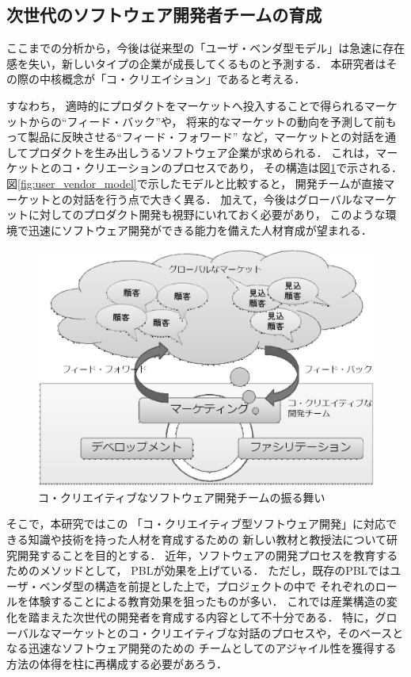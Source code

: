 \documentclass[a4j,9pt,twoside,twocolumn]{jsarticle}
\begin{document}
	\subsection{次世代のソフトウェア開発者チームの育成}

    ここまでの分析から，今後は従来型の「ユーザ・ベンダ型モデル」は急速に存在感を失い，新しいタイプの企業が成長してくるものと予測する．
    本研究者はその際の中核概念が「コ・クリエイション」であると考える．
    
    すなわち，
    適時的にプロダクトをマーケットへ投入することで得られるマーケットからの``フィード・バック''や，
    将来的なマーケットの動向を予測して前もって製品に反映させる``フィード・フォワード''
    など，マーケットとの対話を通してプロダクトを生み出しうるソフトウェア企業が求められる．
    これは，マーケットとのコ・クリエーションのプロセスであり，
    その構造は図\ref{fig:CcSD}で示される．
    図\ref{fig:user_vendor_model}で示したモデルと比較すると，
    開発チームが直接マーケットとの対話を行う点で大きく異る．
    加えて，今後はグローバルなマーケットに対してのプロダクト開発も視野にいれておく必要があり，
    このような環境で迅速にソフトウェア開発ができる能力を備えた人材育成が望まれる．
    
\begin{figure}
\begin{center}
\includegraphics[width=\linewidth]{figs/CcSD.eps}
\caption{コ・クリエイティブなソフトウェア開発チームの振る舞い}
\label{fig:CcSD}
\end{center}
\end{figure}
    
    そこで，本研究ではこの
    「コ・クリエイティブ型ソフトウェア開発」に対応できる知識や技術を持った人材を育成するための
    新しい教材と教授法について研究開発することを目的とする．
    近年，ソフトウェアの開発プロセスを教育するためのメソッドとして，
    PBLが効果を上げている\cite{pub:matsuzawa-2008}．
    ただし，既存のPBLではユーザ・ベンダ型の構造を前提とした上で，プロジェクトの中で
    それぞれのロールを体験することによる教育効果を狙ったものが多い．
    これでは産業構造の変化を踏まえた次世代の開発者を育成する内容として不十分である．
    特に，グローバルなマーケットとのコ・クリエイティブな対話のプロセスや，そのベースとなる迅速なソフトウェア開発のための
    チームとしてのアジャイル性を獲得する方法の体得を柱に再構成する必要があろう．
    
\end{document}
